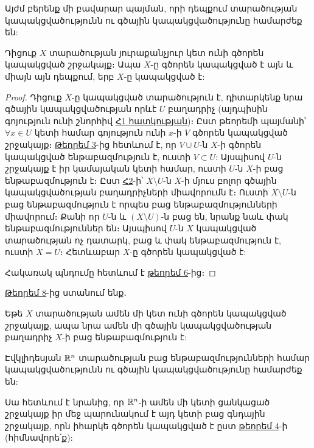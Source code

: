 \documentclass[./main.tex]{subfiles}
\begin{document}
\par Այժմ բերենք մի բավարար պայման, որի դեպքում տարածության կա\-պակ\-ցվա\-ծութ\-յունն ու գծային կապակցվածությունը համարժեք են:

\begin{theorem}\label{ch15thm8}
Դիցուք $X$ տարածության յուրաքանչյուր կետ ունի գծորեն կա\-պա\-կցված շրջակայք։ Ապա $X$-ը գծորեն կապակցված է այն և միայն այն դեպքում, երբ $X$-ը կա\-պակ\-ցված է:
\end{theorem}

\begin{proof}
\par Դիցուք $X$-ը կապակցված տարածություն է, դիտարկենք նրա գծա\-յին կապակցվածության որևէ $U$ բաղադրիչ (այդպիսին գոյություն ունի շնորհիվ \hyperref[Հ1 հատկություն]{Հ1 հատկության})։ Ըստ թեորեմի պայմանի՝ $\forall x\in U$ կետի համար գոյություն ունի $x$-ի $V$ գծորեն կապակցված շրջակայք։ \hyperref[ch15thm3]{Թեորեմ 3}-ից հետևում է, որ $V\cup U$-ն $X$-ի գծորեն կապակցված ենթաբազմություն է, ուստի $V\subset U$: Այսպիսով $U$-ն շրջակայք է իր կամայական կետի համար, ուստի $U$-ն $X$-ի բաց ենթաբազմություն է։ Ըստ \hyperref[Հ2 հատկություն]{Հ2}-ի՝ $X\setminus U$-ն $X$-ի մյուս բոլոր գծային կապակցվածության բաղադրիչների միավորումն է։ Ուստի $X\setminus U$-ն բաց ենթաբազմություն է որպես բաց ենթաբազմությունների մի\-ա\-վորում։ Քանի որ $U$-ն և $(X\setminus U)$-ն բաց են, նրանք նաև փակ ենթաբազմու\-թյուն\-ներ են։ Այսպիսով $U$-ն $X$ կապակցված տարածության ոչ դատարկ, բաց և փակ են\-թա\-բազ\-մու\-թյուն է, ուստի $X=U$։ Հետևաբար $X$-ը գծորեն կապակցված է:

\par Հակառակ պնդումը հետևում է \hyperref[ch15thm6]{թեորեմ 6}-ից։
\end{proof}

\par \hyperref[ch15thm8]{Թեորեմ 8}-ից ստանում ենք․

\begin{hetevanq_counter}\label{ch15cor1}
Եթե $X$ տարածության ամեն մի կետ ունի գծորեն կապակցված շրջակայք, ապա նրա ամեն մի գծային կապակցվածության բաղադրիչ $X$-ի բաց ենթաբազմություն է:
\end{hetevanq_counter}

\begin{hetevanq_counter}\label{ch15cor2}
Էվկլիդեսյան $\mathbb{R}^n$ տարածության բաց ենթաբազմությունների համար կապակցվածությունն ու գծային կապակցվածությունը համարժեք են: 
\end{hetevanq_counter}

\par Սա հետևում է նրանից, որ $\mathbb{R}^n$-ի ամեն մի կետի ցանկացած շրջակայք իր մեջ պա\-րունակում է այդ կետի բաց գնդային շրջակայք, որն իհարկե գծորեն կապակցված է ըստ \hyperref[թեորեմ 4]{թեորեմ 4}-ի (հիմնավորե՛ք):

\newpage


\end{document}

